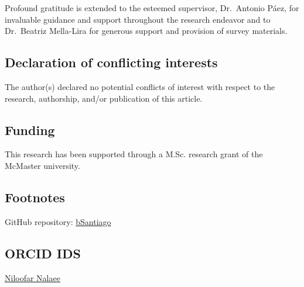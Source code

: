 \documentclass[
]{article}
\begin{document}
Profound gratitude is extended to the esteemed supervisor, Dr.~Antonio
Páez, for invaluable guidance and support throughout the research
endeavor and to Dr.~Beatriz Mella-Lira for generous support and
provision of survey materials.

\hypertarget{declaration-of-conflicting-interests}{%
\subsection{Declaration of conflicting
interests}\label{declaration-of-conflicting-interests}}

The author(s) declared no potential conflicts of interest with respect
to the research, authorship, and/or publication of this article.

\hypertarget{funding}{%
\subsection{Funding}\label{funding}}

This research has been supported through a M.Sc. research grant of the
McMaster university.

\hypertarget{footnotes}{%
\subsection{Footnotes}\label{footnotes}}

GitHub repository: \href{https://paezha.github.io/bSantiago/}{bSantiago}

\hypertarget{orcid-ids}{%
\subsection{ORCID IDS}\label{orcid-ids}}

\href{https://orcid.org/0000-0003-4344-0412}{Niloofar Nalaee}
\end{document}
